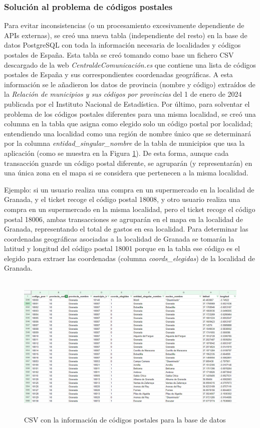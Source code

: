 \subsubsection{Solución al problema de códigos postales}
Para evitar inconsistencias (o un procesamiento excesivamente dependiente de APIs externas), se creó una nueva tabla (independiente del resto) en la base de datos PostgreSQL con toda la información necesaria de localidades y códigos postales de España. Esta tabla se creó tomando como base un fichero CSV descargado de la web \textit{CentraldeComunicación.es} que contiene una lista de códigos postales de España y sus correspondientes coordenadas geográficas. A esta información se le añadieron los datos de provincia (nombre y código) extraídos de la \textit{Relación de municipios y sus códigos por provincias} del 1 de enero de 2024 publicada por el Instituto Nacional de Estadística. Por último, para solventar el problema de los códigos postales diferentes para una misma localidad, se creó una columna en la tabla que asigna como elegido solo un código postal por localidad; entendiendo una localidad como una región de nombre único que se determinará por la columna \textit{entidad\_singular\_nombre} de la tabla de municipios que usa la aplicación (como se muestra en la Figura \ref{fig:CSV_municipios}). De esta forma, aunque cada transacción guarde un código postal diferente, se agruparán (y representarán) en una única zona en el mapa si se considera que pertenecen a la misma localidad.

Ejemplo: si un usuario realiza una compra en un supermercado en la localidad de Granada, y el ticket recoge el código postal 18008, y otro usuario realiza una compra en un supermercado en la misma localidad, pero el ticket recoge el código postal 18006, ambas transacciones se agruparán en el mapa en la localidad de Granada, representando el total de gastos en esa localidad. Para determinar las coordenadas geográficas asociadas a la localidad de Granada se tomarán la latitud y longitud del código postal 18001 porque en la tabla ese código es el elegido para extraer las coordenadas (columna \textit{coords\_elegidas}) de la localidad de Granada.

\begin{figure}[ht!]
    \centering
    \includegraphics[height=70mm]{imagenes/municipios_cp.png}
    \caption{CSV con la información de códigos postales para la base de datos}
    \label{fig:CSV_municipios}
\end{figure}


